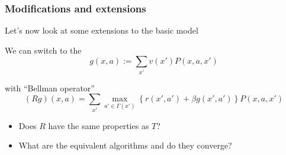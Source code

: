 \documentclass[dvipsnames]{beamer}
\begin{document}
\begin{frame}
    \frametitle{Modifications and extensions}

    Let's now look at some extensions to the basic model
    
\end{frame}





\begin{frame}
    
    We can switch to the 
    \begin{equation*}
       g(x, a) 
             :=
             \sum_{x'} 
                v(x') P(x, a, x') 
    \end{equation*}

    with ``Bellman operator''
    \begin{equation*}
        (Rg)(x, a)
        = 
         \sum_{x'} 
            \max_{a' \in \Gamma(x')}
            \left\{
                r(x', a')
                + \beta
                g(x', a')
            \right\}
            P(x, a, x') 
    \end{equation*}

        \vspace{0.5em}
        \vspace{0.5em}
        \vspace{0.5em}

    \begin{itemize}
        \item Does $R$ have the same properties as $T$?
        \vspace{0.5em}
        \item What are the equivalent algorithms and do they converge?
    \end{itemize}

\end{frame}
\end{document}
